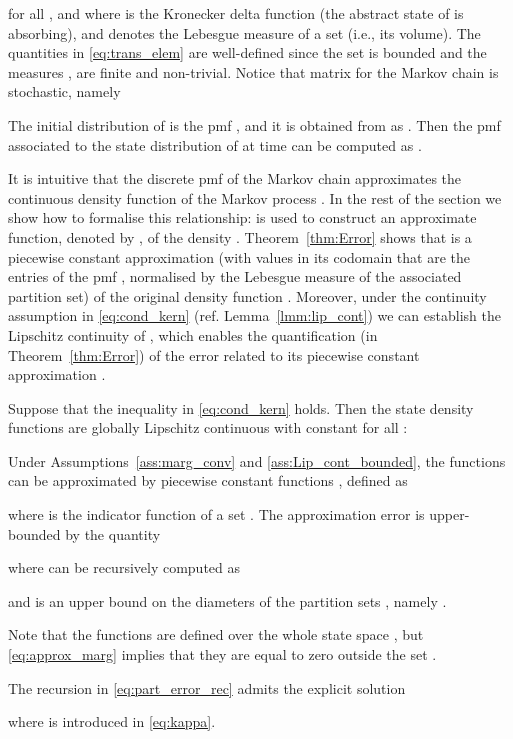 \documentclass{LMCS}
\begin{document}
for all , 
and where  is the Kronecker delta function (the abstract state  of  is absorbing), 
and  denotes the Lebesgue measure of a set (i.e., its volume).    
The quantities in \eqref{eq:trans_elem} are well-defined since the set  is bounded and the measures , 
are finite and non-trivial. 
Notice that matrix  for the Markov chain  is stochastic, namely

The initial distribution of  is the pmf , 
and it is obtained from  as
.
Then the pmf associated to the state distribution of  at time  can be computed as .

It is intuitive that the discrete pmf  of the Markov chain  approximates the continuous density function  of the Markov process . 
In the rest of the section we show how to formalise this relationship: 
 is used to construct an approximate function, denoted by , 
of the density . 
Theorem~\ref{thm:Error} shows that  is a piecewise constant approximation 
(with values in its codomain that are the entries of the pmf , normalised by the Lebesgue measure of the associated partition set) 
of the original density function . 
Moreover, 
under the continuity assumption in \eqref{eq:cond_kern} (ref. Lemma~\ref{lmm:lip_cont}) we can establish the Lipschitz continuity of , 
which enables the quantification (in Theorem~\ref{thm:Error}) of the error related to its piecewise constant approximation .    

\begin{lem}
\label{lmm:lip_cont}
Suppose that the inequality in \eqref{eq:cond_kern} holds. 
Then the state density functions  are globally Lipschitz continuous with constant  for all : 

\end{lem}
\begin{thm}
\label{thm:Error}
Under Assumptions~\ref{ass:marg_conv} and \ref{ass:Lip_cont_bounded}, 
the functions  can be approximated by piecewise constant functions , defined as

where  is the indicator function of a set .
The approximation error is upper-bounded by the quantity

where  can be recursively computed as 

and  is an upper bound on the diameters of the partition sets , namely
.
\end{thm}
Note that the functions  are defined over the whole state space , 
but \eqref{eq:approx_marg} implies that they are equal to zero outside the set .
\begin{cor}
The recursion in \eqref{eq:part_error_rec} admits the explicit solution 

where  is introduced in \eqref{eq:kappa}.  
\end{cor}
\end{document}
